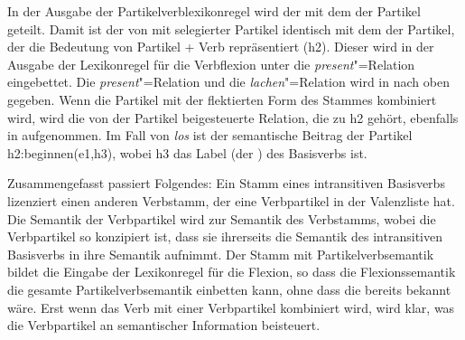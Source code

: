 In der Ausgabe der Partikelverblexikonregel wird der \contw mit dem \contw der Partikel
 geteilt. Damit ist der \ltopw von  mit selegierter Partikel identisch mit dem
\ltopw der Partikel, der die Bedeutung von Partikel + Verb repräsentiert (h2). Dieser \ltopw wird in der Ausgabe der Lexikonregel für die Verbflexion
unter die \emph{present}"=Relation eingebettet. Die \emph{present}"=Relation und die
\emph{lachen}"=Relation wird in \rels nach oben gegeben. Wenn die Partikel mit der
flektierten Form des Stammes  kombiniert wird, wird die von der Partikel beigesteuerte Relation, die zu
h2 gehört, ebenfalls in \rels aufgenommen. Im Fall von \emph{los} ist der semantische Beitrag der Partikel
h2:beginnen(e1,h3), wobei h3 das Label (der \ltopw) des Basisverbs ist. 

Zusammengefasst passiert Folgendes: Ein Stamm eines intransitiven Basisverbs lizenziert einen
anderen Verbstamm, der eine Verbpartikel in der Valenzliste hat. Die Semantik der Verbpartikel wird
zur Semantik des Verbstamms, wobei die Verbpartikel so konzipiert ist, dass sie ihrerseits die
Semantik des intransitiven Basisverbs in ihre Semantik aufnimmt. Der Stamm mit Partikelverbsemantik
bildet die Eingabe der Lexikonregel für die Flexion, so dass die Flexionssemantik die gesamte
Partikelverbsemantik einbetten kann, ohne dass die bereits bekannt wäre. Erst wenn das Verb mit
einer Verbpartikel kombiniert wird, wird klar, was die Verbpartikel an semantischer Information beisteuert.  

